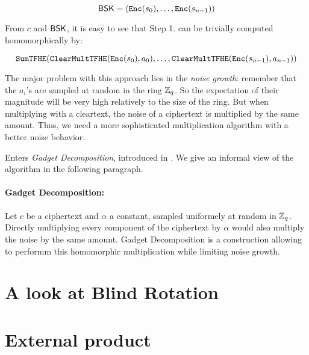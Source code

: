 \begin{equation}
	\textsf{BSK} = \left ( \texttt{Enc}(s_0), \dots, \texttt{Enc}(s_{n-1}) \right )
\end{equation}



From $c$ and $\textsf{BSK}$, it is easy to see that Step 1. can be trivially computed homomorphically by:

\begin{equation*}
	\texttt{SumTFHE}(\texttt{ClearMultTFHE}(\texttt{Enc}(s_0), a_0), \dots, \texttt{ClearMultTFHE}(\texttt{Enc}(s_{n-1}), a_{n-1}))
\end{equation*}


The major problem with this approach lies in the \textit{noise growth}: remember that the $a_i$'s are sampled at random in the ring $\mathbb{Z}_q$. So the expectation of their magnitude will be very high relatively to the size of the ring. But when multiplying with a cleartext, the noise of a ciphertext is multiplied by the same amount. Thus, we need a more sophisticated multiplication algorithm with a better noise behavior.

Enters \textit{Gadget Decomposition}, introduced in \cite{GSW13}. We give an informal view of the algorithm in the following paragraph.


\paragraph{Gadget Decomposition: }


Let $c$ be a \LWE ciphertext and $\alpha$ a constant, sampled uniformely at random in $\mathbb{Z}_q$. Directly multiplying every component of the ciphertext by $\alpha$ would also multiply the noise by the same amount. Gadget Decomposition is a construction allowing to performm this homomorphic multiplication while limiting noise growth.





\section{A look at Blind Rotation}




\section{External product}



